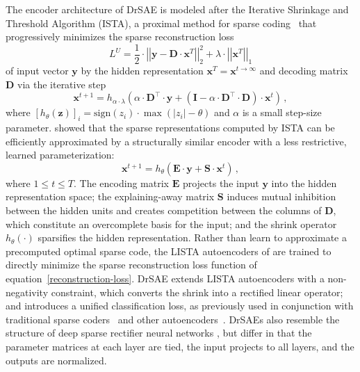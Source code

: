 \documentclass{article} %
\newcommand{\x}{\mathbf{x}}
\newcommand{\y}{\mathbf{y}}
\newcommand{\D}{\mathbf{D}}
\newcommand{\E}{\mathbf{E}}
\newcommand{\I}{\mathbf{I}}
\newcommand{\Sm}{\mathbf{S}}
\begin{document}
The encoder architecture of DrSAE is modeled after the Iterative Shrinkage and Threshold Algorithm (ISTA), a proximal method for sparse coding~\citep{daubechies2004} that progressively minimizes the sparse reconstruction loss 
\begin{equation} \label{reconstruction-loss}
L^U = \frac{1}{2} \cdot \left| \left| \y - \D \cdot \x^T \right| \right|_2^2 + \lambda \cdot \left|\left|\x^T \right|\right|_1
\end{equation} 
of input vector $\y$ by the hidden representation $\x^T = \x^{t \rightarrow \infty}$ and decoding matrix $\D$ via the iterative step 
\begin{equation*}
\x^{t+1} = h_{\alpha \cdot \lambda} \left(\alpha \cdot \D^{\top} \cdot \y + \left(\I - \alpha \cdot \D^{\top} \cdot \D\right) \cdot \x^t \right) \, ,
\end{equation*}  
where $\left[h_{\theta}(\mathbf{z}) \right]_i = \text{sign}\left(z_i \right) \cdot \max\left(\left|z_i \right| - \theta \right)$ and $\alpha$ is a small step-size parameter. %
\citet{gregor2010} showed that the sparse representations computed by ISTA can be efficiently approximated by a structurally similar encoder with a less restrictive, learned parameterization: 
\begin{equation*} 
\x^{t+1} = h_{\theta} \left( \E \cdot \y + \Sm \cdot \x^t \right) \, ,
\end{equation*}
where $1 \leq t \leq T$.
The encoding matrix $\E$ projects the input $\y$ into the hidden representation space; the explaining-away matrix $\Sm$ induces mutual inhibition between the hidden units and creates competition between the columns of $\D$, which constitute an overcomplete basis for the input; and the shrink operator $h_{\theta}(\cdot)$ sparsifies the hidden representation.  Rather than learn to approximate a precomputed optimal sparse code, the LISTA autoencoders of \citet{sprechmann2012a, sprechmann2012b} are trained to directly minimize the sparse reconstruction loss function of equation~\ref{reconstruction-loss}.  DrSAE extends LISTA autoencoders with a non-negativity constraint, which converts the shrink into a rectified linear operator; and introduces a unified classification loss, as previously used in conjunction with traditional sparse coders~\citep{bradley2008, mairal2009, mairal2012} and other autoencoders~\citep{ranzato2008, boureau2010}.
DrSAEs also resemble the structure of deep sparse rectifier neural networks \citep{glorot2011}, but differ in that the parameter matrices at each layer are tied, the input projects to all layers, and the outputs are normalized.  
\end{document}
